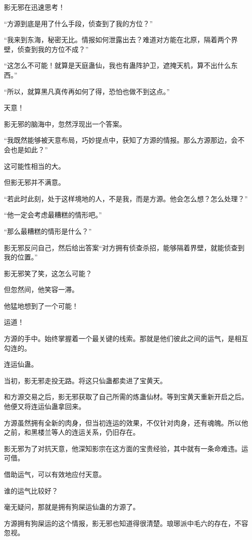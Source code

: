 \begin{this_body}
影无邪在迅速思考！

“方源到底是用了什么手段，侦查到了我的方位？”

“我来到东海，秘密无比。情报如何泄露出去？难道对方能在北原，隔着两个界壁，侦查到我的方位不成？”

“这怎么不可能！就算是天庭蛊仙，我也有蛊阵护卫，遮掩天机，算不出什么东西。”

“所以，就算黑凡真传再如何了得，恐怕也做不到这点。”

天意！

影无邪的脑海中，忽然浮现出一个答案。

“我既然能够被天意布局，巧妙提点中，获知了方源的情报。那么方源那边，会不会也是如此？”

这可能性相当的大。

但影无邪并不满意。

“若此时此刻，处于这样境地的人，不是我，而是方源。他会怎么想？怎么处理？”

“他一定会考虑最糟糕的情形吧。”

“那么最糟糕的情形是什么？”

影无邪反问自己，然后给出答案“对方拥有侦查杀招，能够隔着界壁，就能侦查到我的位置。”

影无邪笑了笑，这怎么可能？

但忽然间，他笑容一滞。

他猛地想到了一个可能！

运道！

方源的手中。始终掌握着一个最关键的线索。那就是他们彼此之间的运气，是相互勾连的。

连运仙蛊。

当初，影无邪走投无路。将这只仙蛊都卖进了宝黄天。

和方源交易之后，影无邪获取了自己所需的炼蛊仙材。等到宝黄天重新开启之后。他便又将连运仙蛊拿回来。

方源虽然拥有全新的肉身，但当初连运的效果，不仅针对肉身，还有魂魄。所以他之前，和黑楼兰等人的连运关系，仍旧存在。

影无邪为了对抗天意，他深知影宗在这方面的宝贵经验，其中就有一条命难违。运可借。

借助运气，可以有效地应付天意。

谁的运气比较好？

毫无疑问，那就是拥有狗屎运仙蛊的方源了。

方源拥有狗屎运的这个情报，影无邪也知道得很清楚。琅琊派中毛六的存在，不容忽视。


\end{this_body}
